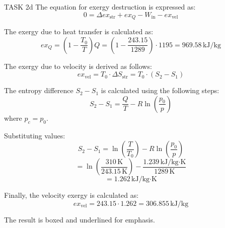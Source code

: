 TASK 2d  
The equation for exergy destruction is expressed as:  
\[
0 = \Delta ex_{\text{str}} + ex_Q - W_{\text{in}} - ex_{\text{vel}}
\]  

The exergy due to heat transfer is calculated as:  
\[
ex_Q = \left( 1 - \frac{T_0}{T} \right) Q = \left( 1 - \frac{243.15}{1289} \right) \cdot 1195 = 969.58 \, \text{kJ/kg}
\]  

The exergy due to velocity is derived as follows:  
\[
ex_{\text{vel}} = T_0 \cdot \Delta S_{\text{str}} = T_0 \cdot (S_2 - S_1)
\]  

The entropy difference \( S_2 - S_1 \) is calculated using the following steps:  
\[
S_2 - S_1 = \frac{Q}{T} - R \ln \left( \frac{p_0}{p} \right)
\]  
where \( p_c = p_0 \).  

Substituting values:  
\[
S_2 - S_1 = \ln \left( \frac{T}{T_0} \right) - R \ln \left( \frac{p_0}{p} \right)
\]  
\[
= \ln \left( \frac{310 \, \text{K}}{243.15 \, \text{K}} \right) - \frac{1.239 \, \text{kJ/kg·K}}{1289 \, \text{K}}
\]  
\[
= 1.262 \, \text{kJ/kg·K}
\]  

Finally, the velocity exergy is calculated as:  
\[
ex_{\text{vel}} = 243.15 \cdot 1.262 = 306.855 \, \text{kJ/kg}
\]  

The result is boxed and underlined for emphasis.